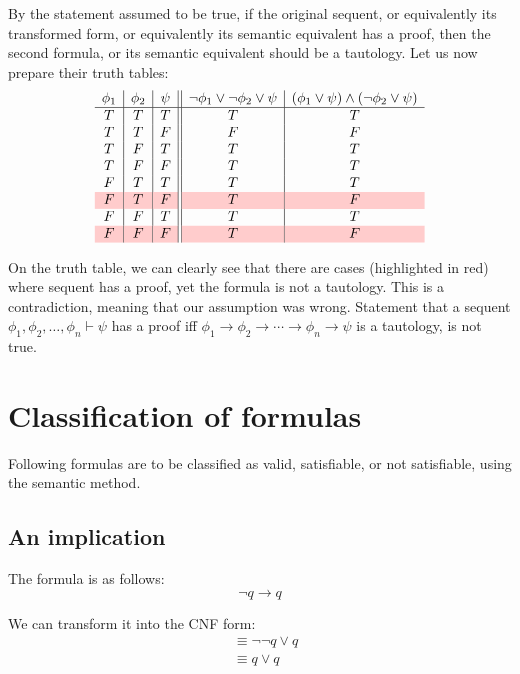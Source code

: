 \documentclass{article}
\newcommand{\imp}{\ensuremath{\rightarrow}}
\newcommand{\seq}{\ensuremath{\vdash}}
\begin{document}
By the statement assumed to be true, if the original sequent,
or equivalently its transformed form, or equivalently
its semantic equivalent has a proof, then the second formula,
or its semantic equivalent should be a tautology. Let us now
prepare their truth tables:
$$
\begin{array}{c|c|c||c|c}
\phi_1 & \phi_2 & \psi & \neg \phi_1 \lor \neg \phi_2 \lor \psi & (\phi_1 \lor \psi) \land (\neg\phi_2 \lor \psi) \\\hline
T      & T      & T    & T                                      & T\\
T      & T      & F    & F                                      & F\\
T      & F      & T    & T                                      & T\\
T      & F      & F    & T                                      & T\\
F      & T      & T    & T                                      & T\\
\rowcolor{Red}
F      & T      & F    & T                                      & F\\
F      & F      & T    & T                                      & T\\
\rowcolor{Red}
F      & F      & F    & T                                      & F
\end{array}
$$

On the truth table, we can clearly see that there are
cases (highlighted in red) where sequent has a proof,
yet the formula is not a tautology.
This is a contradiction, meaning that our assumption
was wrong. Statement that a sequent
$\phi_1, \phi_2, \dotsc, \phi_n \seq \psi$ has a proof iff
$\phi_1 \imp \phi_2 \imp \dotsb \imp \phi_n \imp \psi$
is a tautology, is not true.

\section{Classification of formulas}
Following formulas are to be classified as valid, satisfiable, or
not satisfiable, using the semantic method.

\subsection{An implication}
The formula is as follows:
$$
\neg q \imp q
$$

We can transform it into the CNF form:
\begin{align*}
&\equiv \neg\neg q \lor q\\
&\equiv q \lor q
\end{align*}
\end{document}
